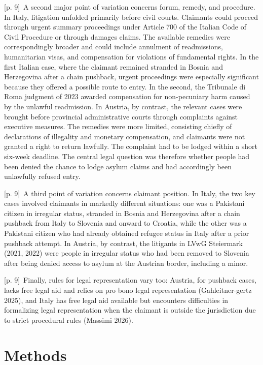 \documentclass[10pt,a4paper]{article}
\begin{document}
{\scriptsize\color{gray} [p. 9]}\ A second major point of variation concerns forum, remedy, and procedure. In Italy, litigation unfolded primarily before civil courts. Claimants could proceed through urgent summary proceedings under Article 700 of the Italian Code of Civil Procedure or through damages claims. The available remedies were correspondingly broader and could include annulment of readmissions, humanitarian visas, and compensation for violations of fundamental rights. In the first Italian case, where the claimant remained stranded in Bosnia and Herzegovina after a chain pushback, urgent proceedings were especially significant because they offered a possible route to entry. In the second, the Tribunale di Roma judgment of 2023 awarded compensation for non-pecuniary harm caused by the unlawful readmission. In Austria, by contrast, the relevant cases were brought before provincial administrative courts through complaints against executive measures. The remedies were more limited, consisting chiefly of declarations of illegality and monetary compensation, and claimants were not granted a right to return lawfully. The complaint had to be lodged within a short six-week deadline. The central legal question was therefore whether people had been denied the chance to lodge asylum claims and had accordingly been unlawfully refused entry.\par
{\scriptsize\color{gray} [p. 9]}\ A third point of variation concerns claimant position. In Italy, the two key cases involved claimants in markedly different situations: one was a Pakistani citizen in irregular status, stranded in Bosnia and Herzegovina after a chain pushback from Italy to Slovenia and onward to Croatia, while the other was a Pakistani citizen who had already obtained refugee status in Italy after a prior pushback attempt. In Austria, by contrast, the litigants in LVwG Steiermark (2021, 2022) were people in irregular status who had been removed to Slovenia after being denied access to asylum at the Austrian border, including a minor.\par
{\scriptsize\color{gray} [p. 9]}\ Finally, rules for legal representation vary too: Austria, for pushback cases, lacks free legal aid and relies on pro bono legal representation (Gahleitner-gertz 2025), and Italy has free legal aid available but encounters difficulties in formalizing legal representation when the claimant is outside the jurisdiction due to strict procedural rules (Massimi 2026).\par
{}\section*{Methods}
\end{document}
